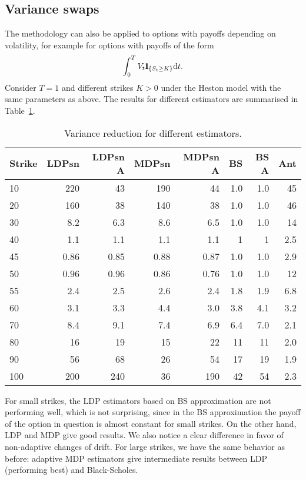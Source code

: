 \documentclass{amsart}[11pt]
\numberwithin{equation}{section}
\numberwithin{theorem}{subsection}
\numberwithin{proposition}{subsection}
\numberwithin{definition}{subsection}
\numberwithin{lemma}{subsection}
\numberwithin{assumption}{subsection}
\newcommand{\D}{\mathrm{d}}
\newcommand{\ind}{1\hspace{-2.1mm}{1}} %
\begin{document}
\subsection{Variance swaps}
The methodology can also be applied to options with payoffs depending on volatility,
for example for options with payoffs of the form
$$
\int_0^T V_t \ind_{\{S_t\geq K\}}\D t.
$$
Consider $T = 1$ and different strikes $K>0$ under the Heston model with the same parameters as above. The results for different estimators are summarised in Table~\ref{tab:VarSwap}.
\begin{table}[H]
\centering
\begin{tabular}{lrrrrrrr}
\toprule
Strike &  LDPsn &  LDPsn A &  MDPsn &  MDPsn A &  BS &  BS A &  Ant \\
\midrule
10  &    {220} &       43 &    190 &       44 & 1.0 &   1.0 &   45 \\
20  &    {160} &       38 &    140 &       38 & 1.0 &   1.0 &   46 \\
30  &    8.2 &      6.3 &    8.6 &      6.5 & 1.0 &   1.0 &   {14} \\
40  &    1.1 &      1.1 &    1.1 &      1.1 &   1 &     1 &  {2.5} \\
45  &   0.86 &     0.85 &   0.88 &     0.87 & 1.0 &   1.0 &  {2.9} \\
50  &   0.96 &     0.96 &   0.86 &     0.76 & 1.0 &   1.0 &   {12} \\
55  &    2.4 &      2.5 &    2.6 &      2.4 & 1.8 &   1.9 &  {6.8} \\
60  &    3.1 &      3.3 &    {4.4} &      3.0 & 3.8 &   4.1 &  3.2 \\
70  &    8.4 &  {9.1} &    7.4 &      6.9 & 6.4 &   7.0 &  2.1 \\
80  &     16 &  19 &     15 &       {22} &  11 &    11 &  2.0 \\
90  &     56 &  {68} &     26 &       54 &  17 &    19 &  1.9 \\
100 &    200 &      {240} &     36 &      190 &  42 &    54 &  2.3 \\
\bottomrule
\end{tabular}
\caption{Variance reduction for different estimators.}\label{tab:VarSwap}
\end{table}

For small strikes, the LDP estimators based on BS approximation are not performing well, which is not surprising, since in the BS approximation the payoff of the option in question is almost constant for small strikes. On the other hand, LDP and MDP give good results. We also notice a clear difference in favor of non-adaptive changes of drift.
For large strikes, we have the same behavior as before: adaptive MDP estimators give intermediate results between LDP (performing best) and Black-Scholes.
\end{document}
